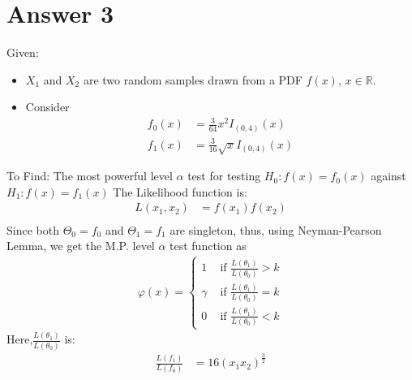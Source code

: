 \documentclass[a4paper]{article}
\begin{document}
\section{Answer 3}
Given:
\begin{itemize}
	\item {$X_1$ and $X_2$ are two random samples drawn from a PDF $f\left( x \right) $, $x \in \mathbb{R}$.}
	\item{Consider
		\begin{equation*}
			\begin{split}
				f_0\left( x \right) &= \frac{3}{64}x^2 I_{\left( 0,4 \right) }\left( x \right) \\
				f_1\left( x \right) &= \frac{3}{16}\sqrt{x} I_{\left( 0,4 \right) }\left( x \right) 
			\end{split}
		\end{equation*}
		}
\end{itemize}
To Find: The most powerful level $\alpha$ test for testing $H_0:f\left( x \right) = f_0\left( x \right) $ against $H_1: f\left( x \right) = f_1\left( x \right) $ 
\newline\newline
The Likelihood function is:
\begin{equation*}
	\begin{split}
		L\left( x_1,x_2 \right) &=  f\left( x_1 \right) f\left( x_2 \right)\\
	\end{split}
\end{equation*}
Since both $\Theta_0 = f_0$ and $\Theta_1 = f_1$ are singleton, thus, using Neyman-Pearson Lemma, we get the M.P. level $\alpha$ test function as
\begin{equation*}
	\begin{split}
		\varphi\left( x \right) = \begin{cases}
			1 &\text{ if } \frac{L\left( \theta_1 \right) }{L\left( \theta_0 \right) }>k\\
			\gamma & \text{ if } \frac{L\left( \theta_1 \right) }{L\left( \theta_0 \right) }=k\\
			0 & \text{ if }\frac{L\left( \theta_1 \right) }{L\left( \theta_0 \right) }<k
		\end{cases}
	\end{split}
\end{equation*} 
Here,$\frac{L\left(\theta_1  \right) }{L\left( \theta_0 \right) }$ is: 
\begin{equation*}
	\begin{split}
		\frac{L\left( f_1 \right) }{L\left( f_0 \right) } &= 16\left( x_1x_2 \right) ^{\frac{3}{2}}
	\end{split}
\end{equation*}
\end{document}
